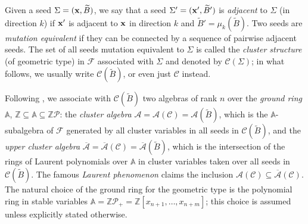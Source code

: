 \documentclass{amsart}
\theoremstyle{definition}
\theoremstyle{remark}
\numberwithin{equation}{section}
\numberwithin{theorem}{section}
\begin{document}
Given a seed $\Sigma=({{\bf x}},\widetilde{B})$, we say that a seed
$\Sigma'=({{\bf x}}',\widetilde{B}')$ is {\em adjacent\/} to $\Sigma$ (in direction
$k$) if ${{\bf x}}'$ is adjacent to ${{\bf x}}$ in direction $k$ and $\widetilde{B}'=
\mu_k(\widetilde{B})$. Two seeds are {\em mutation equivalent\/} if they can
be connected by a sequence of pairwise adjacent seeds. 
The set of all seeds mutation equivalent to $\Sigma$ is called the {\it cluster structure\/} 
(of geometric type) in ${{\mathcal F}}$ associated with $\Sigma$ and denoted by ${{\mathcal C}}(\Sigma)$; in what follows, 
we usually write ${{\mathcal C}}({{\widetilde{B}}})$, or even just ${{\mathcal C}}$ instead. 

Following \cite{FZ2, CAIII}, we associate
with ${{\mathcal C}}({{\widetilde{B}}})$ two algebras of rank $n$ over the {\it ground ring\/} ${{\mathbb A}}$, ${{\mathbb Z}}\subseteq{{\mathbb A}} \subseteq{{\mathbb Z}}{{\mathcal P}}$:
the {\em cluster algebra\/} ${{\mathcal A}}={{\mathcal A}}({{\mathcal C}})={{\mathcal A}}({{\widetilde{B}}})$, which 
is the ${{\mathbb A}}$-subalgebra of ${{\mathcal F}}$ generated by all cluster
variables in all seeds in ${{\mathcal C}}({{\widetilde{B}}})$, and the {\it upper cluster algebra\/}
${\overline{{\mathcal A}}}={\overline{{\mathcal A}}}({{\mathcal C}})={\overline{{\mathcal A}}}({{\widetilde{B}}})$, which is the intersection of the rings of Laurent polynomials over ${{\mathbb A}}$ in cluster variables
taken over all seeds in ${{\mathcal C}}({{\widetilde{B}}})$. The famous {\it Laurent phenomenon\/} \cite{FZ3}
claims the inclusion ${{\mathcal A}}({{\mathcal C}})\subseteq{\overline{{\mathcal A}}}({{\mathcal C}})$. The natural choice of the ground ring for the geometric type
is the polynomial ring in stable variables ${{\mathbb A}}={{\mathbb Z}}{{\mathcal P}}_+={{\mathbb Z}}[x_{n+1},\dots,x_{n+m}]$; this choice is assumed unless
explicitly stated otherwise. 
\end{document}
